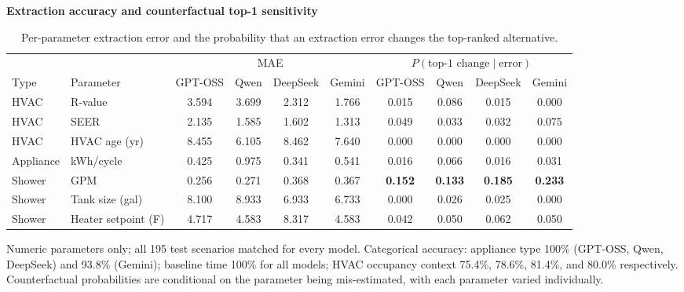 \documentclass[final,3p,times]{elsarticle}
\begin{document}
\begin{table}[htbp]
\begin{threeparttable}
\footnotesize
\centering
\textbf{Extraction accuracy and counterfactual top-1 sensitivity}
\renewcommand{\arraystretch}{1.15}
\begin{tabular}{llcccccccc}
\toprule
 & & \multicolumn{4}{c}{MAE} & \multicolumn{4}{c}{$P(\text{top-1 change} \mid \text{error})$} \\
\cmidrule(lr){3-6}\cmidrule(lr){7-10}
Type & Parameter & GPT-OSS & Qwen & DeepSeek & Gemini & GPT-OSS & Qwen & DeepSeek & Gemini \\
\midrule
HVAC & R-value & 3.594 & 3.699 & 2.312 & 1.766 & 0.015 & 0.086 & 0.015 & 0.000 \\
HVAC & SEER & 2.135 & 1.585 & 1.602 & 1.313 & 0.049 & 0.033 & 0.032 & 0.075 \\
HVAC & HVAC age (yr) & 8.455 & 6.105 & 8.462 & 7.640 & 0.000 & 0.000 & 0.000 & 0.000 \\
Appliance & kWh/cycle & 0.425 & 0.975 & 0.341 & 0.541 & 0.016 & 0.066 & 0.016 & 0.031 \\
Shower & GPM & 0.256 & 0.271 & 0.368 & 0.367 & \textbf{0.152} & \textbf{0.133} & \textbf{0.185} & \textbf{0.233} \\
Shower & Tank size (gal) & 8.100 & 8.933 & 6.933 & 6.733 & 0.000 & 0.026 & 0.025 & 0.000 \\
Shower & Heater setpoint (\textdegree{}F) & 4.717 & 4.583 & 8.317 & 4.583 & 0.042 & 0.050 & 0.062 & 0.050 \\
\bottomrule
\end{tabular}
\renewcommand{\arraystretch}{1.0}
\begin{tablenotes}
\item Numeric parameters only; all 195 test scenarios matched for every model. Categorical accuracy: appliance type 100\% (GPT-OSS, Qwen, DeepSeek) and 93.8\% (Gemini); baseline time 100\% for all models; HVAC occupancy context 75.4\%, 78.6\%, 81.4\%, and 80.0\% respectively. Counterfactual probabilities are conditional on the parameter being mis-estimated, with each parameter varied individually.
\end{tablenotes}
\caption{Per-parameter extraction error and the probability that an extraction error changes the top-ranked alternative.}
\label{tab:extraction_accuracy}
\end{threeparttable}
\end{table}

\FloatBarrier
\end{document}
